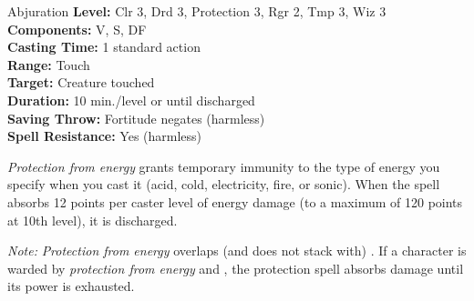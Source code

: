 {Abjuration}
{
	\textbf{Level:}
	Clr 3, Drd 3, Protection 3, Rgr 2, Tmp 3, Wiz 3\\
	\textbf{Components:}
	V, S, DF\\
	\textbf{Casting Time:}
	1 standard action\\
	\textbf{Range:}
	Touch\\
	\textbf{Target:}
	Creature touched\\
	\textbf{Duration:}
	10 min./level or until discharged\\
	\textbf{Saving Throw:}
	Fortitude negates (harmless)\\
	\textbf{Spell Resistance:}
	Yes (harmless)\\
}
{
	\emph{Protection from energy} grants temporary immunity to the type of energy you specify when you cast it (acid, cold, electricity, fire, or sonic). When the spell absorbs 12 points per caster level of energy damage (to a maximum of 120 points at 10th level), it is discharged.

	\textit{Note:} \emph{Protection from energy} overlaps (and does not stack with) . If a character is warded by \emph{protection from energy} and , the protection spell absorbs damage until its power is exhausted.

}
